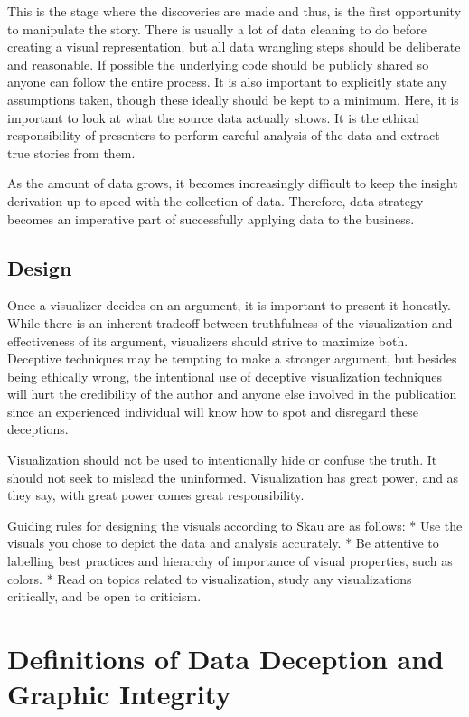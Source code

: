 \documentclass[]{book}
\begin{document}
This is the stage where the discoveries are made and thus, is the first opportunity to manipulate the story. There is usually a lot of data cleaning to do before creating a visual representation, but all data wrangling steps should be deliberate and reasonable. If possible the underlying code should be publicly shared so anyone can follow the entire process. It is also important to explicitly state any assumptions taken, though these ideally should be kept to a minimum. Here, it is important to look at what the source data actually shows. It is the ethical responsibility of presenters to perform careful analysis of the data and extract true stories from them.

As the amount of data grows, it becomes increasingly difficult to keep the insight derivation up to speed with the collection of data. Therefore, data strategy becomes an imperative part of successfully applying data to the business.

\hypertarget{design}{%
\subsection{Design}\label{design}}

Once a visualizer decides on an argument, it is important to present it honestly. While there is an inherent tradeoff between truthfulness of the visualization and effectiveness of its argument, visualizers should strive to maximize both. Deceptive techniques may be tempting to make a stronger argument, but besides being ethically wrong, the intentional use of deceptive visualization techniques will hurt the credibility of the author and anyone else involved in the publication since an experienced individual will know how to spot and disregard these deceptions.

Visualization should not be used to intentionally hide or confuse the truth. It should not seek to mislead the uninformed. Visualization has great power, and as they say, with great power comes great responsibility.

Guiding rules for designing the visuals according to Skau are as follows:
* Use the visuals you chose to depict the data and analysis accurately.
* Be attentive to labelling best practices and hierarchy of importance of visual properties, such as colors.
* Read on topics related to visualization, study any visualizations critically, and be open to criticism.

\hypertarget{definitions-of-data-deception-and-graphic-integrity}{%
\section{Definitions of Data Deception and Graphic Integrity}\label{definitions-of-data-deception-and-graphic-integrity}}
\end{document}
